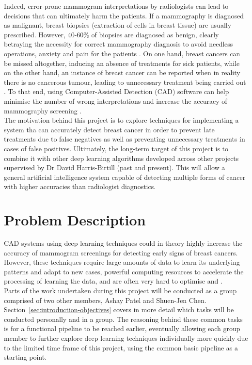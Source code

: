 Indeed, error-prone mammogram interpretations by radiologists can lead to decisions that can ultimately harm the patients. If a mammography is diagnosed as malignant, breast biopsies (extraction of cells in breast tissue) are usually prescribed. However, 40-60\% of biopsies are diagnosed as benign, clearly betraying the necessity for correct mammography diagnosis to avoid needless operations, anxiety and pain for the patients \citep{Hepsag2017}. On one hand, breast cancers can be missed altogether, inducing an absence of treatments for sick patients, while on the other hand, an instance of breast cancer can be reported when in reality there is no cancerous tumour, leading to unnecessary treatment being carried out \citep{Elter2009}. To that end, using Computer-Assisted Detection (CAD) software can help minimise the number of wrong interpretations and increase the accuracy of mammography screening \citep{Shen2017}.\\

The motivation behind this project is to explore techniques for implementing a system tha can accurately detect breast cancer in order to prevent late treatments due to false negatives as well as preventing unnecessary treatments in cases of false positives. Ultimately, the long-term target of this project is to combine it with other deep learning algorithms developed across other projects supervised by Dr David Harris-Birtill (past and present). This will allow a general artificial intelligence system capable of detecting multiple forms of cancer with higher accuracies than radiologist diagnostics.\\


\section{Problem Description}
\label{sec:problem-description}

CAD systems using deep learning techniques could in theory highly increase the accuracy of mammogram screenings for detecting early signs of breast cancers. However, these techniques require large amounts of data to learn its underlying patterns and adapt to new cases, powerful computing resources to accelerate the processing of learning the data, and are often very hard to optimise and .\\

Parts of the work undertaken during this project will be conducted as a group comprised of two other members, Ashay Patel and Shuen-Jen Chen. Section~\ref{sec:introduction-objectives} covers in more detail which tasks will be conducted personally and in a group. The reasoning behind these common tasks is for a functional pipeline to be reached earlier, eventually allowing each group member to further explore deep learning techniques individually more quickly due to the limited time frame of this project, using the common basic pipeline as a starting point.

